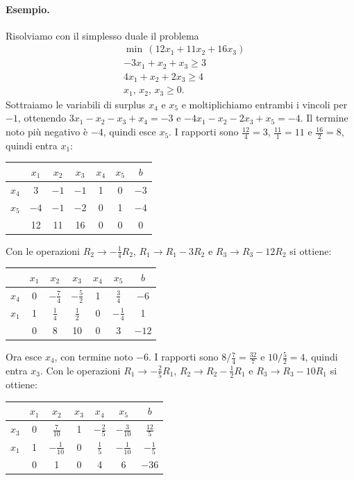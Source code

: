 \paragraph{Esempio.}
Risolviamo con il simplesso duale il problema
\[
\begin{aligned}
&\min\, (12x_1 + 11x_2 + 16x_3) \\
&{-3x_1} + x_2 + x_3 \ge 3 \\
&4x_1 + x_2 + 2x_3 \ge 4 \\
&x_1,\, x_2,\, x_3 \ge 0.
\end{aligned}
\]
Sottraiamo le variabili di surplus $x_4$ e $x_5$ e moltiplichiamo entrambi i vincoli per $-1$, ottenendo $3x_1 - x_2 - x_3 + x_4 = -3$ e $-4x_1 - x_2 - 2x_3 + x_5 = -4$. Il termine noto più negativo è $-4$, quindi esce $x_5$. I rapporti sono $\frac{12}{4} = 3$, $\frac{11}{1} = 11$ e $\frac{16}{2} = 8$, quindi entra $x_1$:
\begin{center}
\begin{tabular}{c|ccccc|c}
 & $x_1$ & $x_2$ & $x_3$ & $x_4$ & $x_5$ & $b$ \\
\hline
$x_4$ & 3 & $-1$ & $-1$ & 1 & 0 & $-3$ \\
$x_5$ & $\boxed{-4}$ & $-1$ & $-2$ & 0 & 1 & $-4$ \\
\hline
 & 12 & 11 & 16 & 0 & 0 & 0 \\
\end{tabular}
\end{center}
Con le operazioni $R_2 \to -\frac14 R_2$, $R_1 \to R_1 - 3R_2$ e $R_3 \to R_3 - 12R_2$ si ottiene:
\begin{center}
\begin{tabular}{c|ccccc|c}
 & $x_1$ & $x_2$ & $x_3$ & $x_4$ & $x_5$ & $b$ \\
\hline
$x_4$ & 0 & $-\frac74$ & $\boxed{-\tfrac52}$ & 1 & $\frac34$ & $-6$ \\
$x_1$ & 1 & $\frac14$ & $\frac12$ & 0 & $-\frac14$ & 1 \\
\hline
 & 0 & 8 & 10 & 0 & 3 & $-12$ \\
\end{tabular}
\end{center}
Ora esce $x_4$, con termine noto $-6$. I rapporti sono $8 / \frac74 = \frac{32}{7}$ e $10 / \frac52 = 4$, quindi entra $x_3$. Con le operazioni $R_1 \to -\frac25 R_1$, $R_2 \to R_2 - \frac12 R_1$ e $R_3 \to R_3 - 10R_1$ si ottiene:
\begin{center}
\begin{tabular}{c|ccccc|c}
 & $x_1$ & $x_2$ & $x_3$ & $x_4$ & $x_5$ & $b$ \\
\hline
$x_3$ & 0 & $\frac{7}{10}$ & 1 & $-\frac25$ & $-\frac{3}{10}$ & $\frac{12}{5}$ \\
$x_1$ & 1 & $\boxed{-\tfrac{1}{10}}$ & 0 & $\frac15$ & $-\frac{1}{10}$ & $-\frac15$ \\
\hline
 & 0 & 1 & 0 & 4 & 6 & $-36$ \\
\end{tabular}
\end{center}
